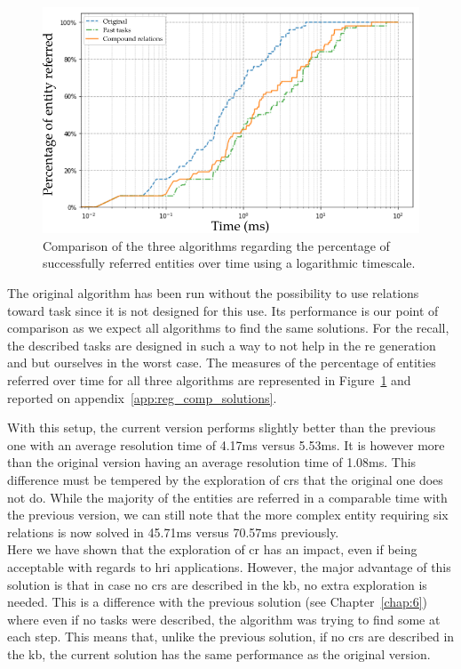 \begin{figure}[ht!]
\centering
\includegraphics[scale=0.5]{figures/chapter7/comparison.png}
\caption{\label{fig:chap7_compare} Comparison of the three algorithms regarding the percentage of successfully referred entities over time using a logarithmic timescale. }
\end{figure}

The original algorithm has been run without the possibility to use relations toward task since it is not designed for this use. Its performance is our point of comparison as we expect all algorithms to find the same solutions. For the recall, the described tasks are designed in such a way to not help in the \acrshort{re} generation and but ourselves in the worst case. The measures of the percentage of entities referred over time for all three algorithms are represented in Figure~\ref{fig:chap7_compare} and reported on appendix~\ref{app:reg_comp_solutions}.

With this setup, the current version performs slightly better than the previous one with an average resolution time of 4.17ms versus 5.53ms. It is however more than the original version having an average resolution time of 1.08ms. This difference must be tempered by the exploration of \acrshort{cr}s that the original one does not do. While the majority of the entities are referred in a comparable time with the previous version, we can still note that the more complex entity requiring six relations is now solved in 45.71ms versus 70.57ms previously. \\

Here we have shown that the exploration of \acrshort{cr} has an impact, even if being acceptable with regards to \acrshort{hri} applications. However, the major advantage of this solution is that in case no \acrshort{cr}s are described in the \acrshort{kb}, no extra exploration is needed. This is a difference with the previous solution (see Chapter~\ref{chap:6}) where even if no tasks were described, the algorithm was trying to find some at each step. This means that, unlike the previous solution, if no \acrshort{cr}s are described in the \acrshort{kb}, the current solution has the same performance as the original version.

